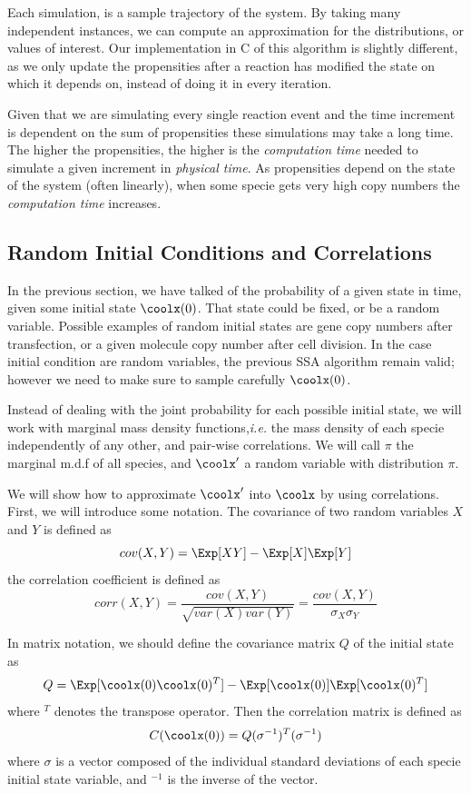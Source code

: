 \documentclass[letterpaper]{article}
\begin{document}
Each simulation, is a sample trajectory of the system. By taking many
independent instances, we can compute an approximation for the
distributions, or values of interest. Our implementation in C of this
algorithm is slightly different, as we only update the propensities
after a reaction has modified the state on which it depends on,
instead of doing it in every iteration.

Given that we are simulating every single reaction event and the time
increment is dependent on the sum of propensities these simulations
may take a long time. The higher the propensities, the higher is the
\emph{computation time} needed to simulate a given increment in
\emph{physical time}. As propensities depend on the state of the
system (often linearly), when some specie gets very high copy numbers
the \emph{computation time} increases. 

\subsection{Random Initial Conditions and Correlations}

In the previous section, we have talked of the probability of a given
state in time, given some initial state $\coolx(0)$. That state could
be fixed, or be a random variable.  Possible examples of random
initial states are gene copy numbers after transfection, or a given
molecule copy number after cell division.  In the case initial
condition are random variables, the previous SSA algorithm remain
valid; however we need to make sure to sample carefully $\coolx(0)$.

Instead of dealing with the joint probability for each possible
initial state, we will work with marginal mass density
functions,\emph{i.e.} the mass density of each specie independently of
any other, and pair-wise correlations. We will call $\pi$ the marginal
m.d.f of all species, and $\coolx^\prime$ a random variable with
distribution $\pi$.

We will show how to approximate $\coolx^\prime$ into $\coolx$ by using
correlations. First, we will introduce some notation.  The covariance
of two random variables $X$ and $Y$ is defined as
$$cov(X,Y) = \Exp[XY] - \Exp[X]\Exp[Y]$$
the correlation coefficient is defined as
$$corr(X,Y) = \frac{cov(X,Y)}{\sqrt{var(X)var(Y)}} = \frac{cov(X,Y)}{\sigma_X \sigma_Y}$$

In matrix notation, we should define the covariance matrix $Q$ of the
initial state as
$$Q = \Exp[\coolx(0)\coolx(0)^T] - \Exp[\coolx(0)]\Exp[\coolx(0)^T]$$
where $^T$ denotes the transpose operator. Then the correlation matrix
is defined as
$$C(\coolx(0)) = Q(\sigma^{-1})^T(\sigma^{-1})$$
where $\sigma$ is a vector composed of the individual standard
deviations of each specie initial state variable, and $^{-1}$ is the
inverse of the vector.
\end{document}
